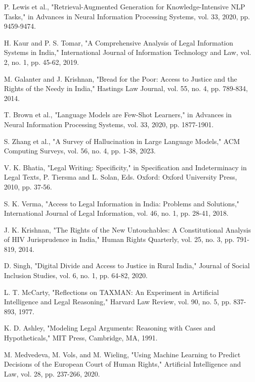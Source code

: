 \documentclass[conference]{IEEEtran}
\begin{document}
\begin{thebibliography}{00}
 P. Lewis et al., "Retrieval-Augmented Generation for Knowledge-Intensive NLP Tasks," in Advances in Neural Information Processing Systems, vol. 33, 2020, pp. 9459-9474.

 H. Kaur and P. S. Tomar, "A Comprehensive Analysis of Legal Information Systems in India," International Journal of Information Technology and Law, vol. 2, no. 1, pp. 45-62, 2019.

 M. Galanter and J. Krishnan, "Bread for the Poor: Access to Justice and the Rights of the Needy in India," Hastings Law Journal, vol. 55, no. 4, pp. 789-834, 2014.

 T. Brown et al., "Language Models are Few-Shot Learners," in Advances in Neural Information Processing Systems, vol. 33, 2020, pp. 1877-1901.

 S. Zhang et al., "A Survey of Hallucination in Large Language Models," ACM Computing Surveys, vol. 56, no. 4, pp. 1-38, 2023.

 V. K. Bhatia, "Legal Writing: Specificity," in Specification and Indeterminacy in Legal Texts, P. Tiersma and L. Solan, Eds. Oxford: Oxford University Press, 2010, pp. 37-56.

 S. K. Verma, "Access to Legal Information in India: Problems and Solutions," International Journal of Legal Information, vol. 46, no. 1, pp. 28-41, 2018.

 J. K. Krishnan, "The Rights of the New Untouchables: A Constitutional Analysis of HIV Jurisprudence in India," Human Rights Quarterly, vol. 25, no. 3, pp. 791-819, 2014.

 D. Singh, "Digital Divide and Access to Justice in Rural India," Journal of Social Inclusion Studies, vol. 6, no. 1, pp. 64-82, 2020.

 L. T. McCarty, "Reflections on TAXMAN: An Experiment in Artificial Intelligence and Legal Reasoning," Harvard Law Review, vol. 90, no. 5, pp. 837-893, 1977.

 K. D. Ashley, "Modeling Legal Arguments: Reasoning with Cases and Hypotheticals," MIT Press, Cambridge, MA, 1991.

 M. Medvedeva, M. Vols, and M. Wieling, "Using Machine Learning to Predict Decisions of the European Court of Human Rights," Artificial Intelligence and Law, vol. 28, pp. 237-266, 2020.


\end{thebibliography}
\end{document}
